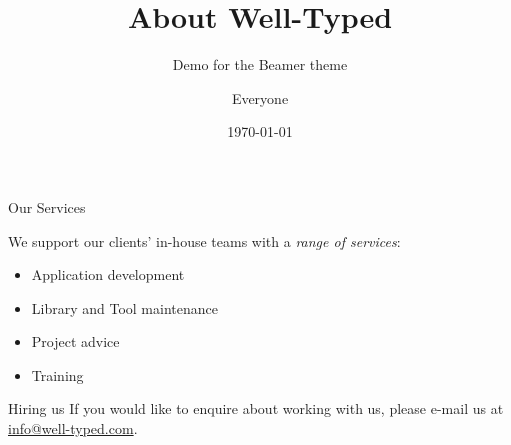 \documentclass{beamer}
\begin{document}
\title{About Well-Typed}
\subtitle{Demo for the Beamer theme}
\author{Everyone}
\date{\today}
\maketitle

\begin{frame}{Our Services}

We support our clients' in-house teams with a \emph{range of services}:
\begin{itemize}
\item Application development
\item Library and Tool maintenance
\item Project advice
\item Training
\end{itemize}

\begin{block}{Hiring us}
If you would like to enquire about working with us, please e-mail us at \href{mailto:info@well-typed.com}{info@well-typed.com}.
\end{block}

\end{frame}
\end{document}
